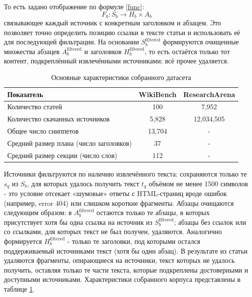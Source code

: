\documentclass{article}
\theoremstyle{definition}
\theoremstyle{plain}
\begin{document}
То есть задано отображение по формуле \eqref{func}:
\begin{equation}\label{func}
  F_b: S_b \to H_b \times A_b
\end{equation}
связывающее каждый источник с конкретным заголовком и абзацем.
Это позволяет точно определить позицию ссылки в тексте статьи и использовать её для последующей фильтрации. 
На основании \(S_b^{\mathrm{filtered}}\) формируются очищенные множества абзацев \(A_b^{\mathrm{filtered}}\) и заголовков \(H_b^{\mathrm{filtered}}\), 
то есть остаётся только тот контент, подкреплённый извлечёнными источниками; всё прочее удаляется. 

\begin{table}[ht!]
  \centering
  \caption{Основные характеристики собранного датасета}
  \label{tab:dataset}
  \begin{tabular}{lcc}
    \hline
    \textbf{Показатель} & \textbf{WikiBench} & \textbf{ResearchArena} \\
    \hline
    Количество статей                             & 100 & 7,952\\
    \hline
    Количество скачанных источников               & 5,828 & 12,034,505\\
    \hline
    Общее число сниппетов                         & 13,704 & -\\
    \hline
    Средний размер плана (число заголовков)       & 37 & -\\
    \hline
    Средний размер секции (число слов)            & 112 & -\\
    \hline
  \end{tabular}
\end{table}

Источники фильтруются по наличию извлечённого текста: сохраняются только те \(s_q\) из \(S_b\), для которых удалось получить текст \(t_q\) объёмом не менее 1500 символов - 
это условие отсекает «шумовые» ответы с HTML-страниц вроде ошибок (например, error 404) или слишком короткие фрагменты. 
Абзацы очищаются следующим образом: в \(A_b^{\mathrm{filtered}}\) остаются только те абзацы, в которых присутствует хотя бы одна ссылка на источник из \(S_b^{\mathrm{filtered}}\); 
абзацы без ссылок или со ссылками, для которых текст не был получен, удаляются. 
Аналогично формируется \(H_b^{\mathrm{filtered}}\) - только те заголовки, под которыми остался поддерживаемый источниками текст (хотя бы один абзац).
В результате из статьи удаляются фрагменты, опирающиеся на источники, текст которых не удалось получить, оставляя только те части текста,
которые подкреплены достоверными и доступными источниками. Характеристики собранного корпуса представлены в таблице \ref{tab:dataset}.
\end{document}
